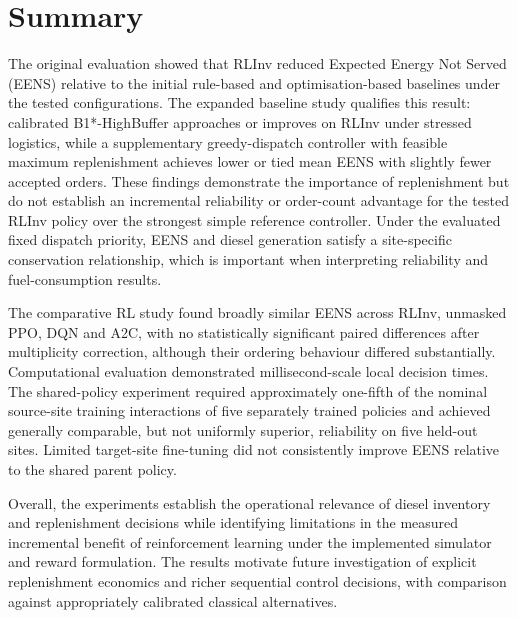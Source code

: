 \section{Summary}
\label{sec:results_summary}
\begin{sloppypar}
\begin{revisedblock}
The original evaluation showed that RLInv reduced Expected Energy Not Served (EENS) relative to the initial rule-based and optimisation-based baselines under the tested configurations. The expanded baseline study qualifies this result: calibrated B1*-HighBuffer approaches or improves on RLInv under stressed logistics, while a supplementary greedy-dispatch controller with feasible maximum replenishment achieves lower or tied mean EENS with slightly fewer accepted orders. These findings demonstrate the importance of replenishment but do not establish an incremental reliability or order-count advantage for the tested RLInv policy over the strongest simple reference controller. Under the evaluated fixed dispatch priority, EENS and diesel generation satisfy a site-specific conservation relationship, which is important when interpreting reliability and fuel-consumption results.

The comparative RL study found broadly similar EENS across RLInv, unmasked PPO, DQN and A2C, with no statistically significant paired differences after multiplicity correction, although their ordering behaviour differed substantially. Computational evaluation demonstrated millisecond-scale local decision times. The shared-policy experiment required approximately one-fifth of the nominal source-site training interactions of five separately trained policies and achieved generally comparable, but not uniformly superior, reliability on five held-out sites. Limited target-site fine-tuning did not consistently improve EENS relative to the shared parent policy.

Overall, the experiments establish the operational relevance of diesel inventory and replenishment decisions while identifying limitations in the measured incremental benefit of reinforcement learning under the implemented simulator and reward formulation. The results motivate future investigation of explicit replenishment economics and richer sequential control decisions, with comparison against appropriately calibrated classical alternatives.
\end{revisedblock}
\end{sloppypar}